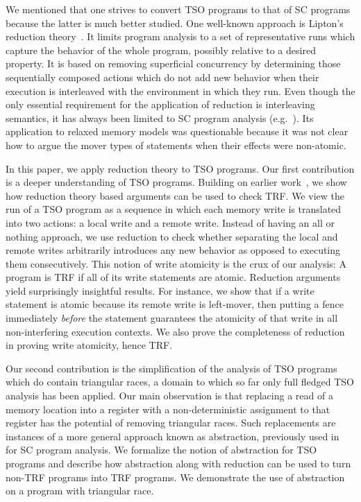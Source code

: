 \documentclass[preprint,9pt]{sigplanconf}
\begin{document}
We mentioned that one strives to convert TSO programs to that of SC programs because the latter is much better studied.
One well-known approach is Lipton's reduction theory~\cite{Lip1975}.
It limits program analysis to a set of representative runs which capture the behavior of the whole program, possibly relative to a desired property.
It is based on removing superficial concurrency by determining those sequentially composed actions which do not add new behavior when their execution is interleaved with the environment in which they run.
Even though the only essential requirement for the application of reduction is interleaving semantics, it has always been limited to SC program analysis (e.g.~\cite{EQT2009,KPH2010,RD1997}).
Its application to relaxed memory models was questionable because it was not clear how to argue the mover types of statements when their effects were non-atomic.

In this paper, we apply reduction theory to TSO programs.
Our first contribution is a deeper understanding of TSO programs.
Building on earlier work~\cite{BDM2013,Owe2010}, we show how reduction theory based arguments can be used to check TRF.
We view the run of a TSO program as a sequence in which each memory write is translated into two actions: a local write and a remote write.
Instead of having an all or nothing approach, we use reduction to check whether separating the local and remote writes arbitrarily introduces any new behavior as opposed to executing them consecutively.
This notion of write atomicity is the crux of our analysis:
A program is TRF if all of its write statements are atomic.
Reduction arguments yield surprisingly insightful results.
For instance, we show that if a write statement is atomic because its remote write is left-mover, then putting a fence immediately {\em before} the statement guarantees the atomicity of that write in all non-interfering execution contexts.
We also prove the completeness of reduction in proving write atomicity, hence TRF.

Our second contribution is the simplification of the analysis of TSO programs which do contain triangular races, a domain to which so far only full fledged TSO analysis has been applied. 
Our main observation is that replacing a read of a memory location into a register with a non-deterministic assignment to that register has the potential of removing triangular races.
Such replacements are instances of a more general approach known as abstraction, previously used in~\cite{EQT2009} for SC program analysis.
We formalize the notion of abstraction for TSO programs and describe how abstraction along with reduction can be used to turn non-TRF programs into TRF programs.
We demonstrate the use of abstraction on a program with triangular race.
\end{document}
